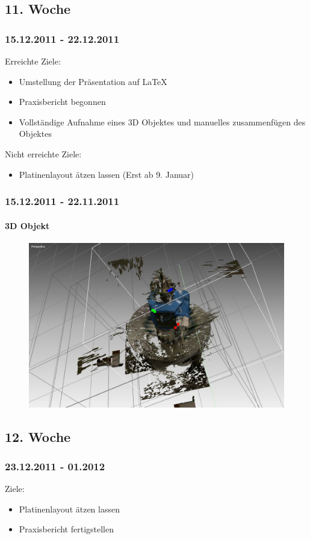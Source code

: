 \documentclass[ngerman]{beamer}
\begin{document}
\subsection{11. Woche}
\begin{frame}\frametitle{15.12.2011 - 22.12.2011}
Erreichte Ziele:
\begin{itemize}
\item Umstellung der Präsentation auf \LaTeX{}
\item Praxisbericht begonnen
\item Vollständige Aufnahme eines 3D Objektes und manuelles zusammenfügen
des Objektes
\end{itemize}
Nicht erreichte Ziele:
\begin{itemize}
\item Platinenlayout ätzen lassen (Erst ab 9. Januar)
\end{itemize}
\end{frame}
\begin{frame}\frametitle{15.12.2011 - 22.11.2011}
\framesubtitle{3D Objekt}
\begin{figure}
\caption{\protect\includegraphics[scale=0.5]{./_Res/Motor_vollstaendig_schlecht}}
\end{figure}
\end{frame}
\subsection{12. Woche}
\begin{frame}\frametitle{23.12.2011 - 01.2012}
Ziele:
\begin{itemize}
	\item Platinenlayout ätzen lassen
	\item Praxisbericht fertigstellen
\end{itemize}
\end{frame}
\end{document}
